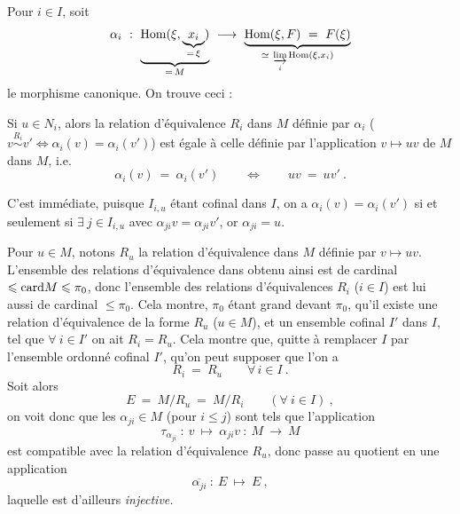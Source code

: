 Pour $i \in I$, soit
\[
\alpha_i \ : \ \underbrace{\mathrm{Hom}(\xi, \underbrace{x_i}_{=\,\xi})}_{=\,M} \ \longrightarrow \ \underbrace{\mathrm{Hom}(\xi,F) \ = \ F(\xi)}_{\simeq\ \varinjlim\limits_{i} \mathrm{Hom}(\xi,x_i)}
\]
le morphisme canonique. On trouve ceci :
\begin{center}
%
\begin{minipage}[c]{0.78\linewidth}
Si $u \in N_i$, alors la relation d'équivalence $R_i$ dans $M$ définie par $\alpha_i$ ($v \overset{R_i}{\sim} v' \Longleftrightarrow \alpha_i(v) = \alpha_i(v')$) est égale à celle définie par l'application $v \longmapsto uv$ de $M$ dans $M$, i.e.
\[
\alpha_i(v) \ = \ \alpha_i(v') \qquad \Longleftrightarrow \qquad uv \ = \ uv' \ .
\]
\end{minipage}
\end{center}

C'est immédiate, puisque $I_{i,u}$ étant cofinal dans $I$, on a $\alpha_i(v) = \alpha_i(v')$ si et seulement si $\exists\ j \in I_{i,u}$ avec $\alpha_{ji}v = \alpha_{ji}v'$, or $\alpha_{ji} = u$. %

Pour $u \in M$, notons $R_u$ la relation d'équivalence dans $M$ définie par $v \longmapsto uv$. L'ensemble des relations d'équivalence dans
obtenu ainsi est de cardinal $\leqslant \mathrm{card} M \leqslant \pi_0$, donc l'ensemble des relations d'équivalences $R_i$ ($i \in I$) est lui aussi de cardinal $\leqslant \pi_0$. Cela montre, $\pi_0$ étant grand devant $\pi_0$, qu'il existe une relation d'équivalence de la forme $R_u$ ($u \in M$), et un ensemble cofinal $I'$ dans $I$, tel que $\forall\ i \in I'$ on ait $R_i = R_u$. Cela montre que, quitte à remplacer $I$ par l'ensemble ordonné cofinal $I'$, qu'on peut supposer que l'on a
\[
R_i \ = \ R_u \qquad \forall\, i \in I \ .
\tag*{(4.15.8.5)}
\]
Soit alors
\[
E \ = \ M/R_u \ = \ M/R_i \qquad (\forall\ i \in I) \ ,
\]
on voit donc que les $\alpha_{ji} \in M$ (pour $i \leqslant j$) sont tels que l'application
\[
\tau_{\alpha_{ji}} \ : \ v \ \longmapsto \ \alpha_{ji}v \ : \ M \ \longrightarrow \ M
\]
est compatible avec la relation d'équivalence $R_u$, donc passe au quotient en une application
\[
\overline{\alpha_{ji}} \ : \ E \ \longmapsto \ E \ ,
\]
laquelle est d'ailleurs \textit{injective.}

